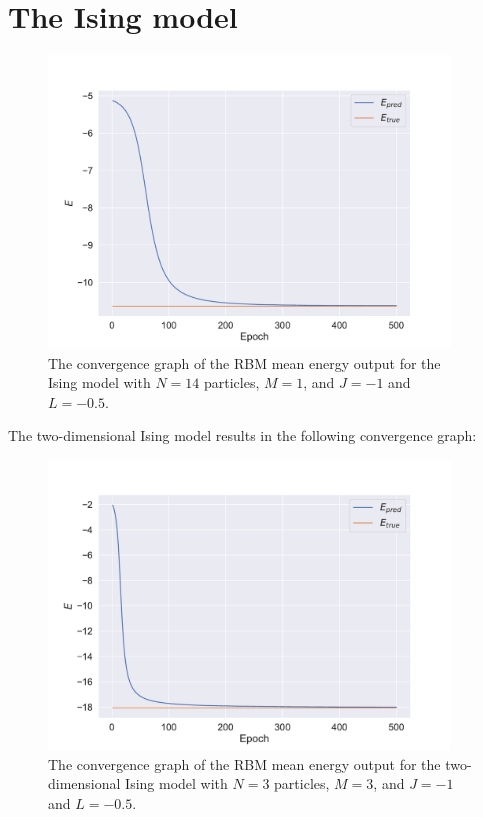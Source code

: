 \section{The Ising model}


\begin{figure}[H]
  \begin{center}
    \includegraphics[width=0.95\textwidth]{Figures/Plots/Ising/ising_conv10}
  \end{center}
  \caption{The convergence graph of the RBM mean energy output for the Ising model with $N = 14$ particles, $M=1$, and $J=-1$ and $L=-0.5$.}
\end{figure}

The two-dimensional Ising model results in the following convergence graph:

\begin{figure}[H]
  \begin{center}
    \includegraphics[width=0.95\textwidth]{Figures/Plots/Ising/ising_conv33}
  \end{center}
  \caption{The convergence graph of the RBM mean energy output for the two-dimensional Ising model with $N = 3$ particles, $M=3$, and $J=-1$ and $L=-0.5$.}
\end{figure}

